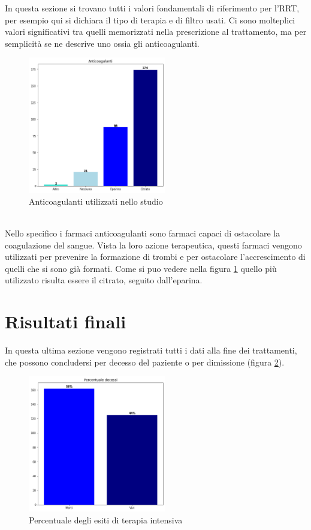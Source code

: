 In questa sezione si trovano tutti i valori fondamentali di riferimento per l'RRT, per esempio qui si dichiara il tipo di terapia e di filtro usati. Ci sono molteplici valori significativi tra quelli memorizzati nella prescrizione al trattamento, ma per semplicità se ne descrive uno ossia gli anticoagulanti.
\begin{figure}[h] 
	\centering
	\includegraphics[width=6cm]{capitolo1/anticoag.png}
	\caption{Anticoagulanti utilizzati nello studio}
	\label{fig:antico}
\end{figure}\\
Nello specifico i farmaci anticoagulanti sono farmaci capaci di ostacolare la coagulazione del sangue. Vista la loro azione terapeutica, questi farmaci vengono utilizzati per prevenire la formazione di trombi e per ostacolare l'accrescimento di quelli che si sono già formati. Come si puo vedere nella figura \ref{fig:antico} quello più utilizzato risulta essere il citrato, seguito dall'eparina.





\section{Risultati finali}

In questa ultima sezione vengono registrati tutti i dati alla fine dei trattamenti, che  possono concludersi per decesso del paziente o per dimissione (figura \ref{fig:dece}).

\begin{figure}[h] 
	\centering
	\includegraphics[width=6cm]{capitolo1/decessi.png}
	\caption{Percentuale degli esiti di terapia intensiva}
	\label{fig:dece}
\end{figure}

